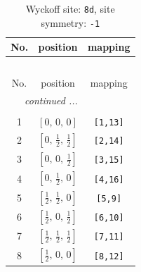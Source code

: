 \documentclass[fleqn,8pt]{jsarticle}
\begin{document}
\begin{longtable}{ccc}
\caption{Wyckoff site: {\tt 8d}, site symmetry: {\tt -1}}
 \\
 \hline \hline
No. & position & mapping \\ \hline \endfirsthead

\multicolumn{2}{l}{\tablename\ \thetable{}} \\
 \hline \hline
No. & position & mapping \\ \hline \endhead

 \hline \hline
\multicolumn{2}{r}{\footnotesize\it continued ...} \\ \endfoot

 \hline \hline
\multicolumn{2}{r}{} \\ \endlastfoot

1 & $\left[ 0,\, 0,\, 0 \right]$ & {\tt [1,13]} \\ \hline
2 & $\left[ 0,\, \frac{1}{2},\, \frac{1}{2} \right]$ & {\tt [2,14]} \\ \hline
3 & $\left[ 0,\, 0,\, \frac{1}{2} \right]$ & {\tt [3,15]} \\ \hline
4 & $\left[ 0,\, \frac{1}{2},\, 0 \right]$ & {\tt [4,16]} \\ \hline
5 & $\left[ \frac{1}{2},\, \frac{1}{2},\, 0 \right]$ & {\tt [5,9]} \\ \hline
6 & $\left[ \frac{1}{2},\, 0,\, \frac{1}{2} \right]$ & {\tt [6,10]} \\ \hline
7 & $\left[ \frac{1}{2},\, \frac{1}{2},\, \frac{1}{2} \right]$ & {\tt [7,11]} \\ \hline
8 & $\left[ \frac{1}{2},\, 0,\, 0 \right]$ & {\tt [8,12]} \\
\end{longtable}
\renewcommand{\arraystretch}{1.2}
\end{document}
